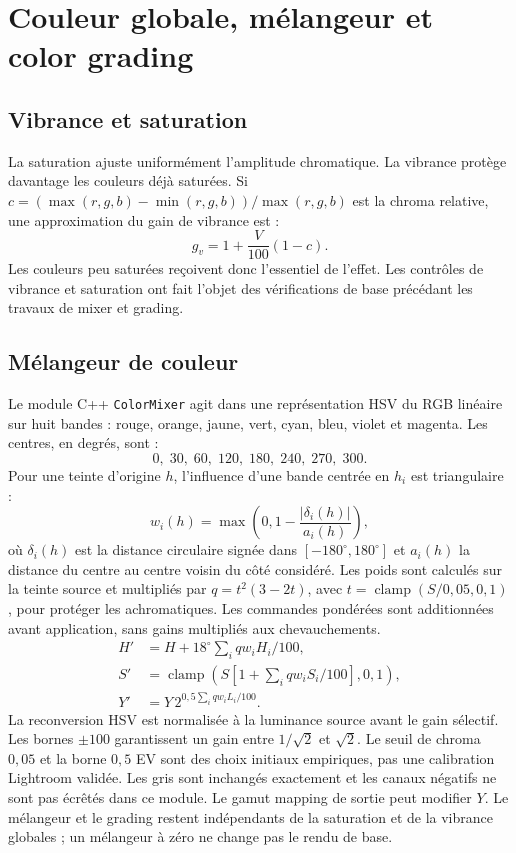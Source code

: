 \section{Couleur globale, mélangeur et color grading}

\subsection{Vibrance et saturation}

La saturation ajuste uniformément l'amplitude chromatique. La vibrance protège davantage les couleurs déjà saturées. Si $c=(\max(r,g,b)-\min(r,g,b))/\max(r,g,b)$ est la chroma relative, une approximation du gain de vibrance est :
\begin{equation}
  g_v = 1+\frac{V}{100}(1-c).
\end{equation}
Les couleurs peu saturées reçoivent donc l'essentiel de l'effet. Les contrôles de vibrance et saturation ont fait l'objet des vérifications de base précédant les travaux de mixer et grading.

\subsection{Mélangeur de couleur}

Le module C++ \texttt{ColorMixer} agit dans une représentation HSV du RGB linéaire
sur huit bandes : rouge, orange, jaune, vert, cyan, bleu, violet et magenta.
Les centres, en degrés, sont :
\[0,\;30,\;60,\;120,\;180,\;240,\;270,\;300.\]
Pour une teinte d'origine $h$, l'influence d'une bande centrée en $h_i$ est triangulaire :
\begin{equation}
  w_i(h)=\max\left(0,1-\frac{|\delta_i(h)|}{a_i(h)}\right),
\end{equation}
où $\delta_i(h)$ est la distance circulaire signée dans $[-180^\circ,180^\circ]$ et $a_i(h)$ la distance du centre au centre voisin du côté considéré. Les poids sont calculés sur la teinte source et multipliés par $q=t^2(3-2t)$, avec $t=\operatorname{clamp}(S/0{,}05,0,1)$, pour protéger les achromatiques. Les commandes pondérées sont additionnées avant application, sans gains multipliés aux chevauchements.
\begin{align}
 H'&=H+18^\circ\sum_i qw_iH_i/100,\\
 S'&=\operatorname{clamp}\left(S\left[1+\sum_i qw_iS_i/100\right],0,1\right),\\
 Y'&=Y\,2^{0{,}5\sum_i qw_iL_i/100}.
\end{align}
La reconversion HSV est normalisée à la luminance source avant le gain sélectif. Les bornes $\pm100$ garantissent un gain entre $1/\sqrt{2}$ et $\sqrt{2}$. Le seuil de chroma $0{,}05$ et la borne $0{,}5$ EV sont des choix initiaux empiriques, pas une calibration Lightroom validée. Les gris sont inchangés exactement et les canaux négatifs ne sont pas écrêtés dans ce module. Le gamut mapping de sortie peut modifier $Y$. Le mélangeur et le grading restent indépendants de la saturation et de la vibrance globales ; un mélangeur à zéro ne change pas le rendu de base.

